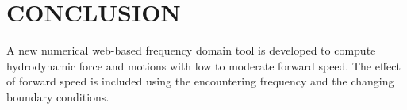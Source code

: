 \chapter{CONCLUSION}

A new numerical web-based frequency domain tool is developed to compute hydrodynamic force and motions with low to moderate forward speed. The effect of forward speed is included using the encountering frequency and the changing boundary conditions.